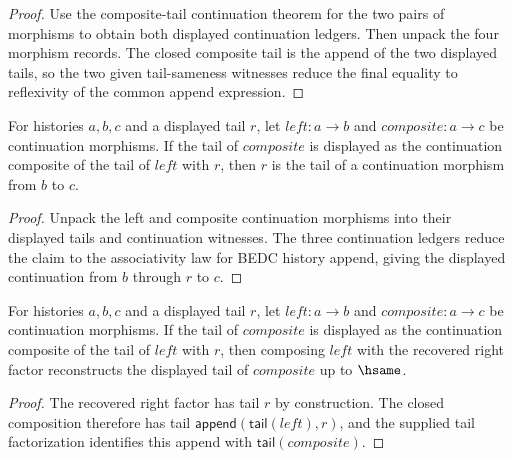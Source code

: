 \begin{proof}
Use the composite-tail continuation theorem for the two pairs of morphisms to
obtain both displayed continuation ledgers. Then unpack the four morphism
records. The closed composite tail is the append of the two displayed tails,
so the two given tail-sameness witnesses reduce the final equality to
reflexivity of the common append expression.
\end{proof}

\begin{theorem}
\label{thm:continuation-morphism-composition-right-factor}
For histories $a,b,c$ and a displayed tail $r$, let $left:a\to b$ and
$composite:a\to c$ be continuation morphisms. If the tail of $composite$ is
displayed as the continuation composite of the tail of $left$ with $r$, then
$r$ is the tail of a continuation morphism from $b$ to $c$.
\end{theorem}
\begin{proof}
Unpack the left and composite continuation morphisms into their displayed
tails and continuation witnesses. The three continuation ledgers reduce the
claim to the associativity law for BEDC history append, giving the displayed
continuation from $b$ through $r$ to $c$.
\end{proof}

\begin{theorem}
\label{thm:category-continuation-right-factor-reconstruction}
For histories $a,b,c$ and a displayed tail $r$, let $left:a\to b$ and
$composite:a\to c$ be continuation morphisms. If the tail of $composite$ is
displayed as the continuation composite of the tail of $left$ with $r$, then
composing $left$ with the recovered right factor reconstructs the displayed
tail of $composite$ up to $\hsame$.
\end{theorem}
\begin{proof}
The recovered right factor has tail $r$ by construction. The closed
composition therefore has tail
$\mathsf{append}(\mathsf{tail}(left),r)$, and the supplied tail
factorization identifies this append with $\mathsf{tail}(composite)$.
\end{proof}

